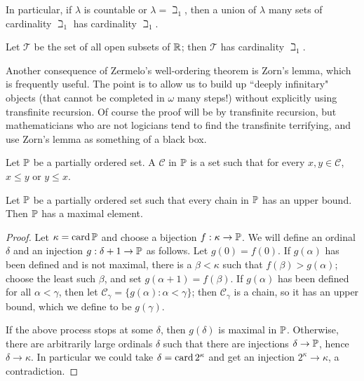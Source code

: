 In particular, if $\lambda$ is countable or $\lambda = \beth_1$, then a union of $\lambda$ many sets of cardinality $\beth_1$ has cardinality $\beth_1$.

\begin{theorem}
\label{cardinality of topology}
Let $\mathcal T$ be the set of all open subsets of $\mathbb{R}$; then $\mathcal T$ has cardinality $\beth_1$.
\end{theorem}

Another consequence of Zermelo's well-ordering theorem is Zorn's lemma, which is frequently useful.
The point is to allow us to build up ``deeply infinitary" objects (that cannot be completed in $\omega$ many steps!) without explicitly using transfinite recursion.
Of course the proof will be by transfinite recursion, but mathematicians who are not logicians tend to find the transfinite terrifying, and use Zorn's lemma as something of a black box.

\begin{definition}
Let $\mathbb{P}$ be a partially ordered set. A  $\mathcal C$ in $\mathbb{P}$ is a set such that for every $x, y \in \mathcal C$, $x \leq y$ or $y \leq x$.
\end{definition}

\begin{theorem}
Let $\mathbb{P}$ be a partially ordered set such that every chain in $\mathbb{P}$ has an upper bound.
Then $\mathbb{P}$ has a maximal element.
\end{theorem}
\begin{proof}
Let $\kappa = \operatorname{card} \mathbb{P}$ and choose a bijection $f: \kappa \to \mathbb{P}$.
We will define an ordinal $\delta$ and an injection $g: \delta + 1 \to \mathbb{P}$ as follows.
Let $g(0) = f(0)$. If $g(\alpha)$ has been defined and is not maximal, there is a $\beta < \kappa$ such that $f(\beta) > g(\alpha)$; choose the least such $\beta$, and set $g(\alpha + 1) = f(\beta)$.
If $g(\alpha)$ has been defined for all $\alpha < \gamma$, then let $\mathcal C_\gamma = \{g(\alpha): \alpha < \gamma\}$; then $\mathcal C_\gamma$ is a chain, so it has an upper bound, which we define to be $g(\gamma)$.

If the above process stops at some $\delta$, then $g(\delta)$ is maximal in $\mathbb{P}$.
Otherwise, there are arbitrarily large ordinals $\delta$ such that there are injections $\delta \to \mathbb{P}$, hence $\delta \to \kappa$.
In particular we could take $\delta = \operatorname{card} 2^\kappa$ and get an injection $2^\kappa \to \kappa$, a contradiction.
\end{proof}

